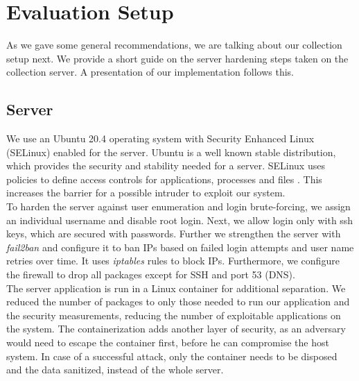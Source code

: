 %
\newpage

\section{Evaluation Setup}
\label{sec:measurement:eval_setup}
%
    As we gave some general recommendations, we are talking about our collection setup next.
    We provide a short guide on the server hardening steps taken on the collection server. A presentation of our implementation follows this.
    
    \subsection{Server}
        \label{subsec:measure:server}
        We use an Ubuntu 20.4 operating system with Security Enhanced Linux (SELinux) \cite{noauthor_what_nodate-1} enabled for the server.
        Ubuntu is a well known stable distribution, which provides the security and stability needed for a server. SELinux uses policies to define access controls for applications, processes and files \cite{noauthor_what_nodate-1}. This increases the barrier for a possible intruder to exploit our system.\\
        
        To harden the server against user enumeration and login brute-forcing, we assign an individual username and disable root login. Next, we allow login only with ssh keys, which are secured with passwords.
        Further we strengthen the server with \textit{fail2ban} and configure it to ban IPs based on failed login attempts and user name retries over time. It uses \textit{iptables} rules to block IPs. Furthermore, we configure the firewall to drop all packages except for SSH and port 53 (DNS).\\
        
        The server application is run in a Linux container for additional separation. We reduced the number of packages to only those needed to run our application and the security measurements, reducing the number of exploitable applications on the system. The containerization adds another layer of security, as an adversary would need to escape the container first, before he can compromise the host system. In case of a successful attack, only the container needs to be disposed and the data sanitized, instead of the whole server.
        
